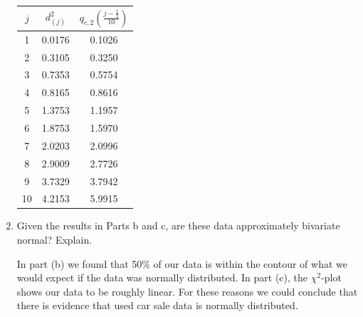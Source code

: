 \begin{enumerate}[label= (\alph*)]
    \begin{center}
        \begin{tabular}{ccc}
            \hline %
            $j$ & $d_{(j)}^{2}$ & $q_{c, 2}\left(\frac{j-\frac{1}{2}}{10}\right)$ \\
            \hline %
            1  & 0.0176 & 0.1026 \\
            2  & 0.3105 & 0.3250 \\
            3  & 0.7353 & 0.5754 \\
            4  & 0.8165 & 0.8616 \\
            5  & 1.3753 & 1.1957 \\
            6  & 1.8753 & 1.5970 \\
            7  & 2.0203 & 2.0996 \\
            8  & 2.9009 & 2.7726 \\
            9  & 3.7329 & 3.7942 \\
            10 & 4.2153 & 5.9915 \\
            \hline %
        \end{tabular}
    \end{center}
    \item Given the results in Parts b and c, are these data approximately bivariate normal?
    Explain.
    \vspace{0.2cm}
    \par
    In part (b) we found that 50\% of our data is within the contour of what we would expect if the data was normally distributed. In part (c), the $\chi^{2}$-plot shows our data to be roughly linear. For these reasons we could conclude that there is evidence that used car sale data is normally distributed.
\end{enumerate}